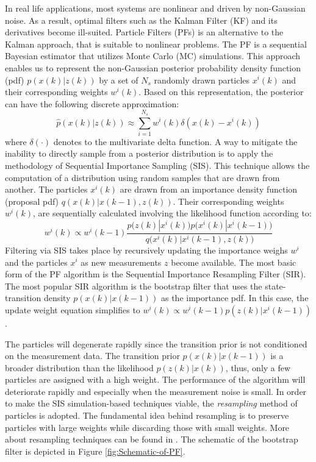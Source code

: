 \documentclass[10pt,twocolumn,twoside]{IEEEtran}
\begin{document}
In real life applications, most systems are nonlinear and driven by
non-Gaussian noise. As a result, optimal filters such as the Kalman
Filter (KF) and its derivatives become ill-suited. Particle Filters
(PFs) is an alternative to the Kalman approach, that is suitable to
nonlinear problems. The PF is a sequential Bayesian estimator that
utilizes Monte Carlo (MC) simulations. This approach enables us to
represent the non-Gaussian posterior probability density function
(pdf) $p(x(k)|z(k))$ by a set of $N_{s}$ randomly drawn particles
$x^{i}(k)$ and their corresponding weights $w^{i}(k)$. Based on
this representation, the posterior can have the following discrete
approximation:
\begin{equation}
\hat{p}(x(k)|z(k))\approx\sum_{i=1}^{N_{s}}w^{i}(k)\delta(x(k)-x^{i}(k))\label{eq:posterior-aprox}
\end{equation}
where $\delta(\cdot)$ denotes to the multivariate delta function.
A way to mitigate the inability to directly sample from a posterior
distribution is to apply the methodology of Sequential Importance
Sampling (SIS). This technique allows the computation of a distribution
using random samples that are drawn from another. The particles $x^{i}\left(k\right)$
are drawn from an importance density function (proposal pdf) $q\left(x\left(k\right)|x\left(k-1\right),z\left(k\right)\right)$.
Their corresponding weights $w^{i}\left(k\right)$, are sequentially
calculated involving the likelihood function according to:
\begin{equation}
w^{i}(k)\propto w^{i}(k-1)\frac{p\big(z(k)|x^{i}(k)\big)p\big(x^{i}(k)|x^{i}(k-1)\big)}{q\big(x^{i}(k)|x^{i}(k-1),z(k)\big)}\label{eq:weights}
\end{equation}
Filtering via SIS takes place by recursively updating the importance
weighs $w^{i}$ and the particles $x^{i}$ as new measurements $z$
become available. The most basic form of the PF algorithm is the Sequential
Importance Resampling Filter (SIR). The most popular SIR algorithm
is the bootstrap filter that uses the state-transition density $p\left(x\left(k\right)|x\left(k-1\right)\right)$
as the importance pdf. In this case, the update weight equation simplifies
to $w^{i}\left(k\right)\propto w^{i}\left(k-1\right)p\left(z\left(k\right)|x^{i}\left(k-1\right)\right)$. 

The particles will degenerate rapidly since the transition prior is
not conditioned on the measurement data. The transition prior $p\left(x\left(k\right)|x\left(k-1\right)\right)$
is a broader distribution than the likelihood $p(z\left(k\right)|x\left(k\right))$,
thus, only a few particles are assigned with a high weight. The performance
of the algorithm will deteriorate rapidly and especially when the
measurement noise is small. In order to make the SIS simulation-based
techniques viable, the \emph{resampling }method of particles is adopted.
The fundamental idea behind resampling is to preserve particles with
large weights while discarding those with small weights. More about
resampling techniques can be found in \cite{ristic2004beyond}. The
schematic of the bootstrap filter is depicted in Figure \ref{fig:Schematic-of-PF}.
\end{document}
